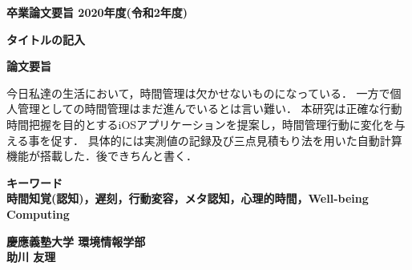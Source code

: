 \begin{center}
\textbf{\Large 卒業論文要旨 2020年度(令和2年度)}

\vspace{6.18mm}

\textbf{\Large タイトルの記入}
\end{center}

\vspace{10mm}

\begin{flushleft}
\textbf{論文要旨}\\
\end{flushleft}
今日私達の生活において，時間管理は欠かせないものになっている．
一方で個人管理としての時間管理はまだ進んでいるとは言い難い．
本研究は正確な行動時間把握を目的とするiOSアプリケーションを提案し，時間管理行動に変化を与える事を促す．
具体的には実測値の記録及び三点見積もり法を用いた自動計算機能が搭載した．後できちんと書く．




\begin{flushleft}
\textbf{キーワード}\\
\textbf{時間知覚(認知)，遅刻，行動変容，メタ認知，心理的時間，Well-being Computing}

\end{flushleft}

\begin{flushright}
\textbf{慶應義塾大学 環境情報学部}\\
\textbf{助川 友理}
\end{flushright}
\newpage


